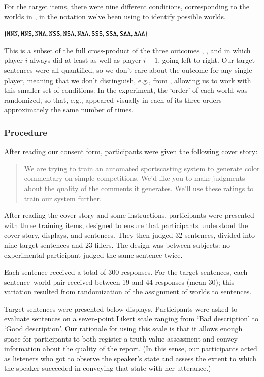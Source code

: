\documentclass[leqno,12pt]{article}
\begin{document}
For the target items, there were nine different conditions,
corresponding to the worlds in , in the notation we've been
using to identify possible worlds.
%
\begin{examples}
\item\label{conds} $\left\{ \texttt{NNN}, \texttt{NNS}, \texttt{NNA},
    \texttt{NSS}, \texttt{NSA}, \texttt{NAA}, \texttt{SSS}, \texttt{SSA},
    \texttt{SAA}, \texttt{AAA} \right\}$
\end{examples}
%
This is a subset of the full cross-product of the three outcomes
, , and  in which player $i$ always did at
least as well as player $i+1$, going left to right.  Our target
sentences were all quantified, so we don't care about the outcome for
any single player, meaning that we don't distinguish, e.g.,
 from , allowing us to work with this smaller
set of conditions. In the experiment, the `order' of each world was
randomized, so that, e.g.,  appeared visually in each of
its three orders approximately the same number of times.

\subsubsection{Procedure} 

After reading our consent form, participants were given the following
cover story:

\begin{quote}
  We are trying to train an automated sportscasting system to generate
  color commentary on simple competitions. We'd like you to make
  judgments about the quality of the comments it generates. We'll use
  these ratings to train our system further.
\end{quote}

After reading the cover story and some instructions, participants were
presented with three training items, designed to ensure that participants
understood the cover story, displays, and sentences. They then judged 32
sentences, divided into nine target sentences and 23 fillers. The
design was between-subjects: no experimental participant judged the same sentence twice. 
 
Each sentence received a total of 300 responses. For the target
sentences, each sentence--world pair received between 19 and 44
responses (mean 30); this variation resulted from randomization of the
assignment of worlds to sentences.

Target sentences were presented below displays. Participants were
asked to evaluate sentences on a seven-point Likert scale ranging from
`Bad description' to `Good description'. Our rationale for using this
scale is that it allows enough space for participants to both register
a truth-value assessment and convey information about the quality of
the report. (In this sense, our participants acted as listeners who
got to observe the speaker's state and assess the extent to which the
speaker succeeded in conveying that state with her utterance.)
\end{document}
